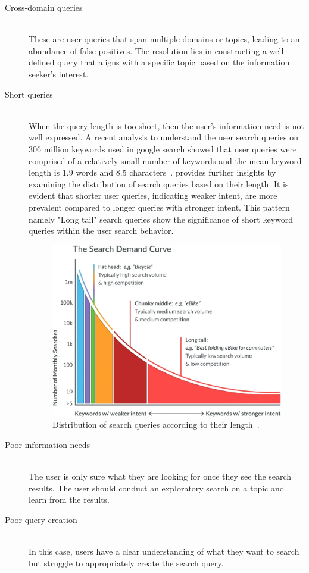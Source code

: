 \begin{description}
	\item[Cross-domain queries] \hfill \\ These are user queries that span multiple domains or topics, leading to an abundance of false positives. The resolution lies in constructing a well-defined query that aligns with a specific topic based on the information seeker's interest.
	
	\item[Short queries] \hfill \\ When the query length is too short, then the user's information need is not well expressed. A recent analysis to understand the user search queries on 306 million keywords used in google search showed that user queries were comprised of a relatively small number of keywords and the mean keyword length is 1.9 words and 8.5 characters~\cite{google_keyword}.  provides further insights by examining the distribution of search queries based on their length. It is evident that shorter user queries, indicating weaker intent, are more prevalent compared to longer queries with stronger intent. This pattern namely "Long tail" search queries show the significance of short keyword queries within the user search behavior.
	
	\begin{figure}[h]
		\centering
		\includegraphics[width=.55\textwidth]{images/outside/search_demand_curve.png}
		\caption[Search query distribution]{Distribution of search queries according to their length~\cite{mozWhatKeywords}. \label{fig:longtail_keywords}}
	\end{figure} 
	
	\item[Poor information needs] \hfill \\ The user is only sure what they are looking for once they see the search results. The user should conduct an exploratory search on a topic and learn from the results.
	
	\item[Poor query creation] \hfill \\ In this case, users have a clear understanding of what they want to search but struggle to appropriately create the search query.
\end{description}


